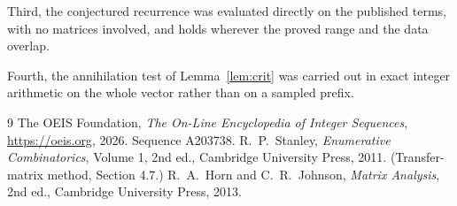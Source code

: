 \documentclass[11pt,a4paper]{article}
\theoremstyle{plain}
\theoremstyle{definition}
\begin{document}
Third, the conjectured recurrence was evaluated directly on the published terms, with no
matrices involved, and holds wherever the proved range and the data overlap.

Fourth, the annihilation test of Lemma~\ref{lem:crit} was carried out in exact integer
arithmetic on the whole vector rather than on a sampled prefix.

\begin{thebibliography}{9}
 The OEIS Foundation, \emph{The On-Line Encyclopedia of Integer
Sequences}, \url{https://oeis.org}, 2026. Sequence A203738.
 R.~P.~Stanley, \emph{Enumerative Combinatorics}, Volume 1, 2nd ed.,
Cambridge University Press, 2011. (Transfer-matrix method, Section 4.7.)
 R.~A.~Horn and C.~R.~Johnson, \emph{Matrix Analysis}, 2nd ed., Cambridge
University Press, 2013.
\end{thebibliography}
\end{document}
